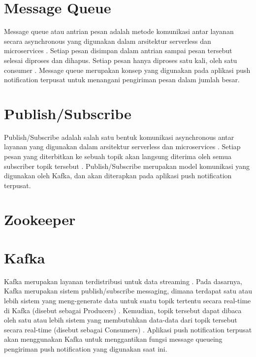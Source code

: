 \section{Message Queue}
\par Message queue atau antrian pesan adalah metode komunikasi antar layanan secara asynchronous yang digunakan dalam arsitektur serverless dan microservices \cite{message-queue-online}. Setiap pesan disimpan dalam antrian sampai pesan tersebut selesai diproses dan dihapus. Setiap pesan hanya diproses satu kali, oleh satu consumer \cite{message-queue-online}. Message queue merupakan konsep yang digunakan pada aplikasi push notification terpusat untuk menangani pengiriman pesan dalam jumlah besar.

\section{Publish/Subscribe}
\par Publish/Subscribe adalah salah satu bentuk komunikasi asynchronous antar layanan yang digunakan dalam arsitektur serverless dan microservices \cite{publish-subscribe-online}. Setiap pesan yang diterbitkan ke sebuah topik akan langsung diterima oleh semua subscriber topik tersebut \cite{publish-subscribe-online}. Publish/Subscribe merupakan model komunikasi yang digunakan oleh Kafka, dan akan diterapkan pada aplikasi push notification terpusat.

\section{Zookeeper}

\section{Kafka}
\par Kafka merupakan layanan terdistribusi untuk data streaming \cite{kafka-online}. Pada dasarnya, Kafka merupakan sistem publish/subscribe messaging, dimana terdapat satu atau lebih sistem yang meng-generate data untuk suatu topik tertentu secara real-time di Kafka (disebut sebagai Producers) \cite{kafka-online}. Kemudian, topik tersebut dapat dibaca oleh satu atau lebih sistem yang membutuhkan data-data dari topik tersebut secara real-time (disebut sebagai Consumers) \cite{kafka-online}. Aplikasi push notification terpusat akan menggunakan Kafka untuk menggantikan fungsi message queueing pengiriman push notification yang digunakan saat ini.

